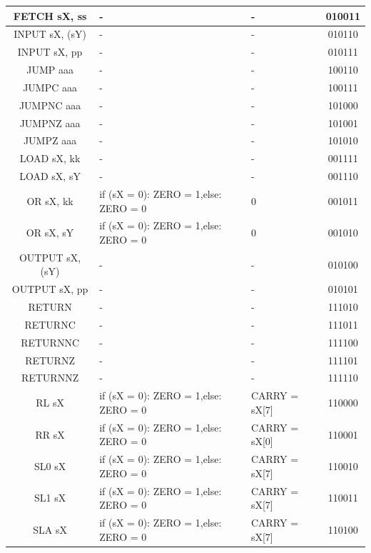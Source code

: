 \documentclass{scrartcl}
\begin{document}
\begin{longtable}{||c|p{6cm}|p{6cm}|c||}
    FETCH sX, ss & - & - & 010011 \\ \hline
    INPUT sX, (sY) & - & - & 010110 \\ \hline
    INPUT sX, pp & - & - & 010111 \\ \hline
    JUMP aaa & - & - & 100110 \\ \hline
    JUMPC aaa & - & - & 100111 \\ \hline
    JUMPNC aaa & - & - & 101000 \\ \hline
    JUMPNZ aaa & - & - & 101001 \\ \hline
    JUMPZ aaa & - & - & 101010 \\ \hline 
    LOAD sX, kk & - & - & 001111 \\ \hline
    LOAD sX, sY & - & - & 001110 \\ \hline 
    OR sX, kk & if (sX = 0): ZERO = 1,\newline else: ZERO = 0 & 0 & 001011 \\ \hline
    OR sX, sY & if (sX = 0): ZERO = 1,\newline else: ZERO = 0 & 0 & 001010 \\ \hline
    OUTPUT sX, (sY) & - & - & 010100 \\ \hline
    OUTPUT sX, pp & - & - & 010101 \\ \hline
    RETURN & - & - & 111010 \\ \hline
    RETURNC & - & - & 111011 \\ \hline
    RETURNNC & - & - & 111100 \\ \hline
    RETURNZ & - & - & 111101 \\ \hline
    RETURNNZ & - & - & 111110 \\ \hline
    RL sX & if (sX = 0): ZERO = 1,\newline else: ZERO = 0
    & CARRY = sX[7] & 110000 \\ \hline
    RR sX & if (sX = 0): ZERO = 1,\newline else: ZERO = 0
    & CARRY = sX[0] & 110001 \\ \hline
    SL0 sX & if (sX = 0): ZERO = 1,\newline else: ZERO = 0
    & CARRY = sX[7] & 110010 \\ \hline
    SL1 sX & if (sX = 0): ZERO = 1,\newline else: ZERO = 0
    & CARRY = sX[7] & 110011 \\ \hline
    SLA sX & if (sX = 0): ZERO = 1,\newline else: ZERO = 0
    & CARRY = sX[7] & 110100 \\ \hline

\end{longtable}
\end{document}
